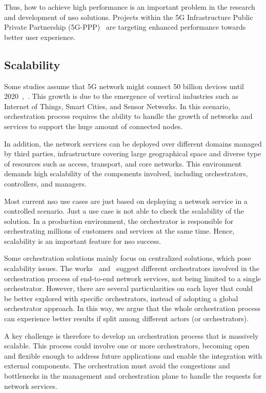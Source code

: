 Thus, how to achieve high performance is an important problem in the research and development of \gls{nso} solutions. Projects within the 5G Infrastructure Public Private Partnership (5G-PPP)~\cite{elayoubi:hal-01488208} are targeting enhanced performance towards better user experience. 

\subsection{Scalability}

Some studies assume that 5G network might connect 50 billion devices until 2020~\cite{Panwar2016ACommunication},~\cite{Evans2011TheEverything}. This growth is due to the emergence of vertical industries such as Internet of Things, Smart Cities, and Sensor Networks. In this scenario, orchestration process requires the ability to handle the growth of networks and services to support the huge amount of connected nodes.

In addition, the network services can be deployed over different domains managed by third parties, infrastructure covering large geographical space and diverse type of resources such as access, transport, and core networks. This environment demands high scalability of the components involved, including orchestrators, controllers, and managers. 

Most current \gls{nso} use cases are just based on deploying a network service in a controlled scenario. Just a use case is not able to check the scalability of the solution. In a production environment, the orchestrator is responsible for orchestrating millions of customers and services at the same time. Hence, scalability is an important feature for \gls{nso} success.

Some orchestration solutions mainly focus on centralized solutions, which pose scalability issues. The works~\cite{Alvizu2016AdvanceEra} and~\cite{Garay2016ServiceForward} suggest different orchestrators involved in the orchestration process of end-to-end network services, not being limited to a single orchestrator. However, there are several particularities on each layer that could be better explored with specific orchestrators, instead of adopting a global orchestrator approach. In this way, we argue that the whole orchestration process can experience better results if split among different actors (or orchestrators). 

A key challenge is therefore to develop an orchestration process that is massively scalable. This process could involve one or more orchestrators, becoming open and flexible enough to address future applications and enable the integration with external components. The orchestration must avoid the congestions and bottlenecks in the management and orchestration plane to handle the requests for network services.
 
